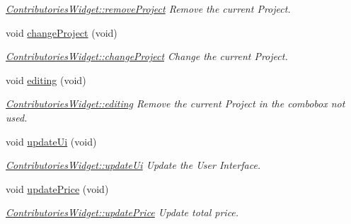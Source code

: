 \begin{DoxyCompactItemize}
\begin{DoxyCompactList}\small\item\em \hyperlink{classGui_1_1Widgets_1_1ContributoriesWidget_ad907c5827c4e1ee3b82adbe6f2f77309}{Contributories\+Widget\+::remove\+Project} Remove the current Project. \end{DoxyCompactList}\item 
\hypertarget{classGui_1_1Widgets_1_1ContributoriesWidget_a5a4be90c82f8b6d0b0e3b7a658a488ee}{}void \hyperlink{classGui_1_1Widgets_1_1ContributoriesWidget_a5a4be90c82f8b6d0b0e3b7a658a488ee}{change\+Project} (void)\label{classGui_1_1Widgets_1_1ContributoriesWidget_a5a4be90c82f8b6d0b0e3b7a658a488ee}

\begin{DoxyCompactList}\small\item\em \hyperlink{classGui_1_1Widgets_1_1ContributoriesWidget_a5a4be90c82f8b6d0b0e3b7a658a488ee}{Contributories\+Widget\+::change\+Project} Change the current Project. \end{DoxyCompactList}\item 
\hypertarget{classGui_1_1Widgets_1_1ContributoriesWidget_acb1cc99ae6f72205394d7b52f0a5f20d}{}void \hyperlink{classGui_1_1Widgets_1_1ContributoriesWidget_acb1cc99ae6f72205394d7b52f0a5f20d}{editing} (void)\label{classGui_1_1Widgets_1_1ContributoriesWidget_acb1cc99ae6f72205394d7b52f0a5f20d}

\begin{DoxyCompactList}\small\item\em \hyperlink{classGui_1_1Widgets_1_1ContributoriesWidget_acb1cc99ae6f72205394d7b52f0a5f20d}{Contributories\+Widget\+::editing} Remove the current Project in the combobox not used. \end{DoxyCompactList}\item 
\hypertarget{classGui_1_1Widgets_1_1ContributoriesWidget_a5231cbde89d73ccdbb734e6aee0cb3ff}{}void \hyperlink{classGui_1_1Widgets_1_1ContributoriesWidget_a5231cbde89d73ccdbb734e6aee0cb3ff}{update\+Ui} (void)\label{classGui_1_1Widgets_1_1ContributoriesWidget_a5231cbde89d73ccdbb734e6aee0cb3ff}

\begin{DoxyCompactList}\small\item\em \hyperlink{classGui_1_1Widgets_1_1ContributoriesWidget_a5231cbde89d73ccdbb734e6aee0cb3ff}{Contributories\+Widget\+::update\+Ui} Update the User Interface. \end{DoxyCompactList}\item 
\hypertarget{classGui_1_1Widgets_1_1ContributoriesWidget_ad6c925eaf605e1b0382b0ec00eac5abf}{}void \hyperlink{classGui_1_1Widgets_1_1ContributoriesWidget_ad6c925eaf605e1b0382b0ec00eac5abf}{update\+Price} (void)\label{classGui_1_1Widgets_1_1ContributoriesWidget_ad6c925eaf605e1b0382b0ec00eac5abf}

\begin{DoxyCompactList}\small\item\em \hyperlink{classGui_1_1Widgets_1_1ContributoriesWidget_ad6c925eaf605e1b0382b0ec00eac5abf}{Contributories\+Widget\+::update\+Price} Update total price. \end{DoxyCompactList}\end{DoxyCompactItemize}
